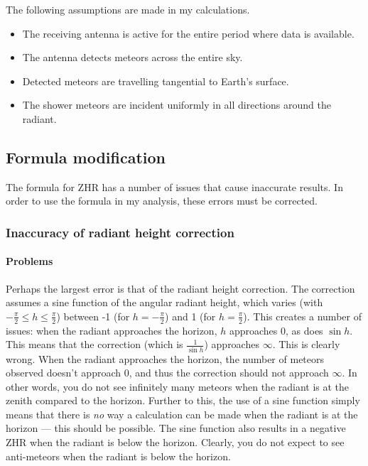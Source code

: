 The following assumptions are made in my calculations.  
\begin{itemize} 
	\item The receiving antenna is active for the entire period where data is
	available.  
	\item The antenna detects meteors across the entire sky.  
	\item Detected meteors are travelling tangential to Earth's surface.  
	\item The shower meteors are incident uniformly in all directions around the
		radiant.
\end{itemize}

\subsection{Formula modification}

The formula \cite{zhr} for ZHR has a number of issues that cause inaccurate
results. In order to use the formula in my analysis, these errors must be
corrected.

\subsubsection{Inaccuracy of radiant height correction}

\paragraph{Problems\\} Perhaps the largest error is that of the radiant height
correction. The correction assumes a sine function of the angular radiant
height, which varies (with $-\frac{\pi}{2} \leq h \leq \frac{\pi}{2}$) between
-1 (for $h = -\frac{\pi}{2}$) and 1 (for $h = \frac{\pi}{2}$). This creates a
number of issues: when the radiant approaches the horizon, $h$ approaches 0, as
does $\sin h$. This means that the correction (which is $\frac{1}{\sin h}$)
approaches $\infty$. This is clearly wrong. When the radiant approaches the
horizon, the number of meteors observed doesn't approach 0, and thus the
correction should not approach $\infty$. In other words, you do not see
infinitely many meteors when the radiant is at the zenith compared to the
horizon. Further to this, the use of a sine function simply means that there is
\textit{no} way a calculation can be made when the radiant is at the horizon
--- this should be possible. The sine function also results in a negative ZHR
when the radiant is below the horizon. Clearly, you do not expect to see
anti-meteors when the radiant is below the horizon. 

